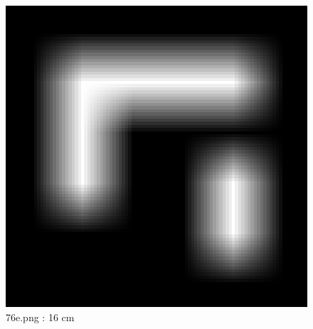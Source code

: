 \documentclass[11pt,a4,BCOR=0cm]{scrartcl}
\begin{document}
\newpage
\begin{figure}
  \begin{center}
    \includegraphics[natwidth=6,natheight=6,width=16cm]{76e.png}
    \caption{76e.png : 16 cm}
    \label{fig:76e.png}
  \end{center}
\end{figure}
\newpage
\end{document}
